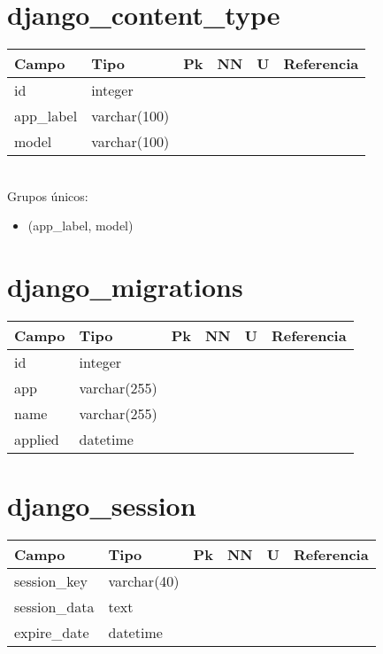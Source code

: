 \section{django\_content\_type}

\begin{tabular}{|l|l|l|l|l|l|}
	\hline
	\textbf{Campo} & \textbf{Tipo} & \textbf{Pk} & \textbf{NN} & \textbf{U} & \textbf{Referencia} \\
	\hline
	id & integer & \req & \req & \req & \\
	app\_label & varchar(100) & \nreq & \req & \nreq & \\
	model & varchar(100) & \nreq & \req & \nreq & \\
	\hline
\end{tabular} \\

Grupos únicos:

\begin{itemize}
	\item (app\_label, model)
\end{itemize}

\section{django\_migrations}

\begin{tabular}{|l|l|l|l|l|l|}
	\hline
	\textbf{Campo} & \textbf{Tipo} & \textbf{Pk} & \textbf{NN} & \textbf{U} & \textbf{Referencia} \\
	\hline
	id & integer & \req & \req & \req & \\
	app & varchar(255) & \nreq & \req & \nreq & \\
	name & varchar(255) & \nreq & \req & \nreq & \\
	applied & datetime & \nreq & \req & \nreq & \\
	\hline
\end{tabular}

\section{django\_session}

\begin{tabular}{|l|l|l|l|l|l|}
	\hline
	\textbf{Campo} & \textbf{Tipo} & \textbf{Pk} & \textbf{NN} & \textbf{U} & \textbf{Referencia} \\
	\hline
	session\_key & varchar(40) & \req & \req & \req & \\
	session\_data & text & \nreq & \req & \nreq & \\
	expire\_date & datetime & \nreq & \req & \nreq & \\
	\hline
\end{tabular}
